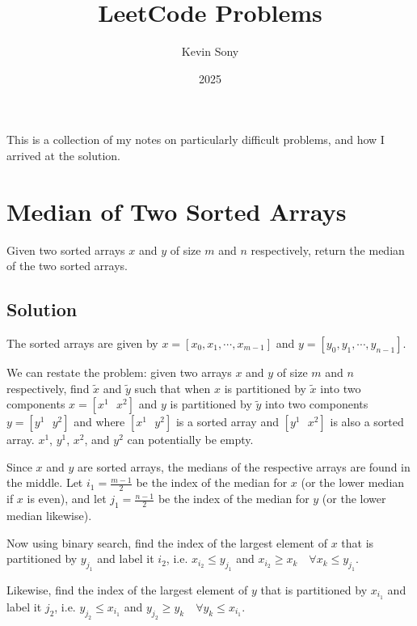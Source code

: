 \documentclass{article}
\title{LeetCode Problems}
\author{Kevin Sony}
\date{2025}
\begin{document}
\maketitle

This is a collection of my notes on particularly difficult problems, and how I arrived at the solution.

\section*{Median of Two Sorted Arrays}

Given two sorted arrays $x$ and $y$ of size $m$ and $n$ respectively, return the median of the two sorted arrays.

\subsection*{Solution}

The sorted arrays are given by $x = [x_0, x_1, \cdots, x_{m - 1}]$ and $y = [y_0, y_1, \cdots, y_{n - 1}]$.

We can restate the problem: given two arrays $x$ and $y$ of size $m$ and $n$ respectively, find $\tilde{x}$ and $\tilde{y}$ such that when $x$ is partitioned by $\tilde{x}$ into two components $x = [x^1\text{  }x^2]$ and $y$ is partitioned by $\tilde{y}$ into two components $y = [y^1\text{  }y^2]$ and where $[x^1\text{  }y^2]$ is a sorted array and $[y^1\text{  }x^2]$ is also a sorted array. $x^1$, $y^1$, $x^2$, and $y^2$ can potentially be empty.

Since $x$ and $y$ are sorted arrays, the medians of the respective arrays are found in the middle. Let $i_1 = \frac{m - 1}{2}$ be the index of the median for $x$ (or the lower median if $x$ is even), and let $j_1 = \frac{n - 1}{2}$ be the index of the median for $y$ (or the lower median likewise).

Now using binary search, find the index of the largest element of $x$ that is partitioned by $y_{j_1}$ and label it $i_2$, i.e. $x_{i_2} \leq y_{j_1}$ and $x_{i_2} \geq x_k \quad \forall x_k \leq y_{j_1}$.

Likewise, find the index of the largest element of $y$ that is partitioned by $x_{i_1}$ and label it $j_2$, i.e. $y_{j_2} \leq x_{i_1}$ and $y_{j_2} \geq y_k \quad \forall y_k \leq x_{i_1}$.
\end{document}
